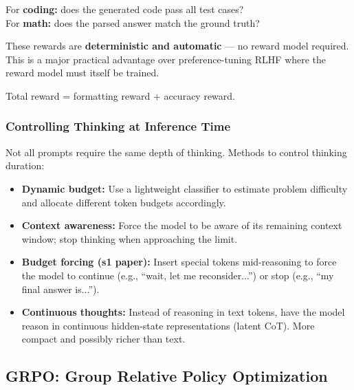 \documentclass[11pt, a4paper]{article}
\begin{document}
\begin{defbox}
For \textbf{coding:} does the generated code pass all test cases?\\
For \textbf{math:} does the parsed answer match the ground truth?

These rewards are \textbf{deterministic and automatic} --- no reward model required. This is a major practical advantage over preference-tuning RLHF where the reward model must itself be trained.

Total reward = formatting reward + accuracy reward.
\end{defbox}

\subsubsection{Controlling Thinking at Inference Time}

\begin{defbox}
Not all prompts require the same depth of thinking. Methods to control thinking duration:
\begin{itemize}[leftmargin=1.5em]
  \item \textbf{Dynamic budget:} Use a lightweight classifier to estimate problem difficulty and allocate different token budgets accordingly.
  \item \textbf{Context awareness:} Force the model to be aware of its remaining context window; stop thinking when approaching the limit.
  \item \textbf{Budget forcing (s1 paper):} Insert special tokens mid-reasoning to force the model to continue (e.g., ``wait, let me reconsider...'') or stop (e.g., ``my final answer is...'').
  \item \textbf{Continuous thoughts:} Instead of reasoning in text tokens, have the model reason in continuous hidden-state representations (latent CoT). More compact and possibly richer than text.
\end{itemize}
\end{defbox}

\subsection{GRPO: Group Relative Policy Optimization}
\end{document}
